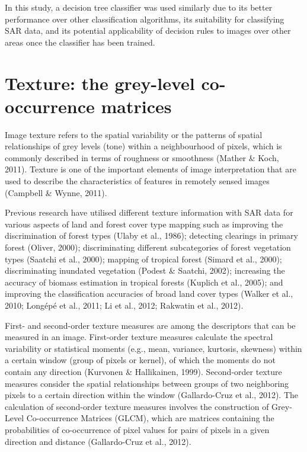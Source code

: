 In this study, a decision tree classifier was used similarly due to its better performance over other classification algorithms, its suitability for classifying SAR data, and its potential applicability of decision rules to images over other areas once the classifier has been trained.

\section{Texture: the grey-level co-occurrence matrices}
\label{sec: litrev-texture-glcm}

Image texture refers to the spatial variability or the patterns of spatial relationships of grey levels (tone) within a neighbourhood of pixels, which is commonly described in terms of roughness or smoothness (Mather \& Koch, 2011). Texture is one of the important elements of image interpretation that are used to describe the characteristics of features in remotely sensed images (Campbell \& Wynne, 2011).

Previous research have utilised different texture information with SAR data for various aspects of land and forest cover type mapping such as improving the discrimination of forest types (Ulaby et al., 1986); detecting clearings in primary forest (Oliver, 2000); discriminating different subcategories of forest vegetation types (Saatchi et al., 2000); mapping of tropical forest (Simard et al., 2000); discriminating inundated vegetation (Podest \& Saatchi, 2002); increasing the accuracy of biomass estimation in tropical forests (Kuplich et al., 2005); and improving the classification accuracies of broad land cover types (Walker et al., 2010; Longépé et al., 2011; Li et al., 2012; Rakwatin et al., 2012).

First- and second-order texture measures are among the descriptors that can be measured in an image. First-order texture measures calculate the spectral variability or statistical moments (e.g., mean, variance, kurtosis, skewness) within a certain window (group of pixels or kernel), of which the moments do not contain any direction (Kurvonen \& Hallikainen, 1999). Second-order texture measures consider the spatial relationships between groups of two neighboring pixels to a certain direction within the window (Gallardo-Cruz et al., 2012). The calculation of second-order texture measures involves the construction of Grey-Level Co-occurrence Matrices (GLCM), which are matrices containing the probabilities of co-occurrence of pixel values for pairs of pixels in a given direction and distance (Gallardo-Cruz et al., 2012).

